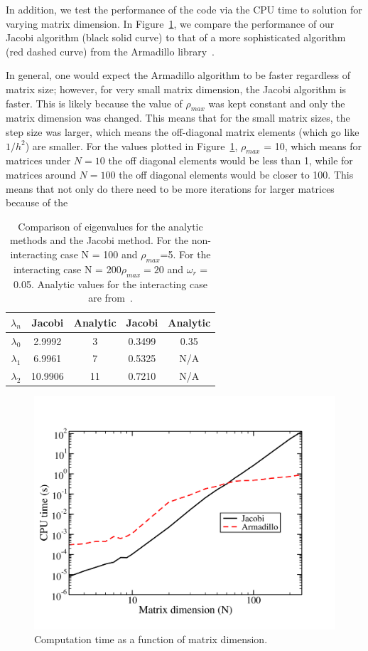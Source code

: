 \documentclass[prc,amsmath,twocolumn,superscriptaddress]{revtex4}
\begin{document}
In addition, we test the performance of the code via the CPU time to solution for varying matrix dimension. In Figure~\ref{arma}, we compare the performance of our Jacobi algorithm (black solid curve) to that of a more sophisticated algorithm (red dashed curve) from the Armadillo library~\cite{armadillo}. 

In general, one would expect the Armadillo algorithm to be faster regardless of matrix size; however, for very small matrix dimension, the Jacobi algorithm is faster. This is likely because the value of $\rho_{max}$ was kept constant and only the matrix dimension was changed. This means that for the small matrix sizes, the step size was larger, which means the off-diagonal matrix elements (which go like $1/h^2$) are smaller. For the values plotted in Figure~\ref{arma}, $\rho_{max}$ = 10, which means for matrices under $N=10$ the off diagonal elements would be less than 1, while for matrices around $N=100$ the off diagonal elements would be closer to 100. This means that not only do there need to be more iterations for larger matrices because of the %

\begin{table}[b]
\centering
\begin{tabular}{|c|c|c|c|c|}
\hline
$\lambda_n$&Jacobi & Analytic & Jacobi & Analytic\\
\hline
$\lambda_0$&2.9992&3&0.3499&0.35\\
$\lambda_1$&6.9961&7&0.5325&N/A\\
$\lambda_2$&10.9906&11&0.7210&N/A\\
\hline
\end{tabular}
\caption{Comparison of eigenvalues for the analytic methods and the Jacobi method. For the non-interacting case N = 100 and $\rho_{max}$=5. For the interacting case N = 200$\rho_{max}=20$ and $\omega_r$ = 0.05. Analytic values for the interacting case are from~\cite{interact}.}
\label{eigen}
\end{table}

\begin{figure}[t]
\includegraphics[scale=0.33]{N_time2.pdf}
\caption{Computation time as a function of matrix dimension.}
\label{arma}
\end{figure}
\end{document}
